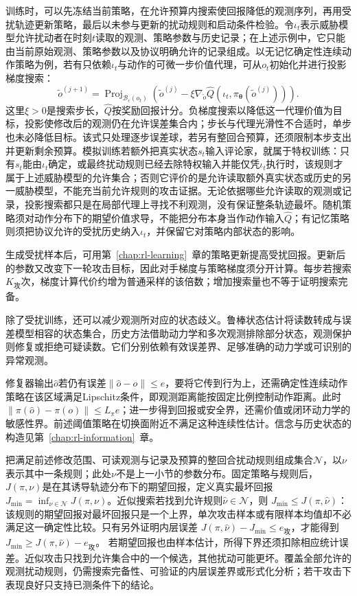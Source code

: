 训练时，可以先冻结当前策略，在允许预算内搜索使回报降低的观测序列，再用受扰轨迹更新策略，最后以未参与更新的扰动规则和启动条件检验。令$\iota_t$表示威胁模型允许扰动者在时刻$t$读取的观测、策略参数与历史记录；在上述示例中，它只能由当前原始观测、策略参数以及协议明确允许的记录组成。以无记忆确定性连续动作策略为例，若有只依赖$\iota_t$与动作的可微一步价值代理，可从$o_t$初始化并进行投影梯度搜索：
\[
  \widetilde o^{(j+1)}
   =\operatorname{Proj}_{\mathcal B_\epsilon(o_t)}
      \left(\widetilde o^{(j)}
       -\xi\nabla_{\widetilde o}
          \widehat Q(\iota_t,\pi_{\bm{\theta}}(\widetilde o^{(j)}))\right).
\]
这里$\xi>0$是搜索步长，$\widehat Q$按奖励回报计分。负梯度搜索以降低这一代理价值为目标，投影使修改后的观测仍在允许误差集合内；步长与代理光滑性不合适时，单步也未必降低目标。该式只处理逐步误差球，若另有整回合预算，还须限制本步支出并更新剩余预算。模拟训练若额外把真实状态$s_t$输入评论家，就属于特权训练：只有$s_t$能由$\iota_t$确定，或最终扰动规则已经去除特权输入并能仅凭$\iota_t$执行时，该规则才属于上述威胁模型的允许集合；否则它评价的是允许读取额外真实状态或历史的另一威胁模型，不能充当前允许规则的攻击证据。无论依据哪些允许读取的观测或记录，投影搜索都只是在局部代理上寻找不利观测，没有保证整条轨迹最坏。随机策略须对动作分布下的期望价值求导，不能把分布本身当作动作输入$\widehat Q$；有记忆策略则须把协议允许的受扰历史纳入$\iota_t$，并保留它对策略内部状态的影响。

生成受扰样本后，可用第~\ref{chap:rl-learning}~章的策略更新提高受扰回报。更新后的参数又改变下一轮攻击目标，因此对手梯度与策略梯度须分开计算。每步若搜索$K_{\text{攻}}$次，梯度计算代价约增为普通采样的该倍数；增加搜索量也不等于证明搜索完备。

除了受扰训练，还可以减少观测所对应的状态歧义。鲁棒状态估计将读数转成与误差模型相容的状态集合，历史方法借助动力学和多次观测排除部分状态，观测保护则修复或拒绝可疑读数。它们分别依赖有效误差界、足够准确的动力学或可识别的异常观测。

修复器输出$\widehat o$若仍有误差$\|\widehat o-o\|\leq e$，要将它传到行为上，还需确定性连续动作策略在该区域满足Lipschitz条件，即观测距离能按固定比例控制动作距离。此时
$\|\pi(\widehat o)-\pi(o)\|\leq L_\pi e$；进一步得到回报或安全界，还需价值或闭环动力学的敏感性界。前述阈值策略在切换面附近不满足这种连续性估计。信念与历史状态的构造见第~\ref{chap:rl-information}~章。

把满足前述修改范围、可读观测与记录及预算的整回合扰动规则组成集合$\mathcal N$，以$\nu$表示其中一条规则；此处$\nu$不是上一小节的参数分布。固定策略与规则后，$J(\pi,\nu)$是在其诱导轨迹分布下的期望回报，定义真实最坏回报$J_{\min}=\inf_{\nu\in\mathcal N}J(\pi,\nu)$。近似搜索若找到允许规则$\widehat\nu\in\mathcal N$，则
$J_{\min}\leq J(\pi,\widehat\nu)$：该规则的期望回报对最坏回报只是一个上界，单次攻击样本或有限样本均值却不必满足这一确定性比较。只有另外证明内层误差
$J(\pi,\widehat\nu)-J_{\min}\leq e_{\text{攻}}$，才能得到
$J_{\min}\geq J(\pi,\widehat\nu)-e_{\text{攻}}$。
若期望回报也由样本估计，所得下界还须扣除相应统计误差。近似攻击只找到允许集合中的一个候选，其他扰动可能更坏。覆盖全部允许的观测扰动规则，仍需搜索完备性、可验证的内层误差界或形式化分析；若干攻击下表现良好只支持已测条件下的结论。

